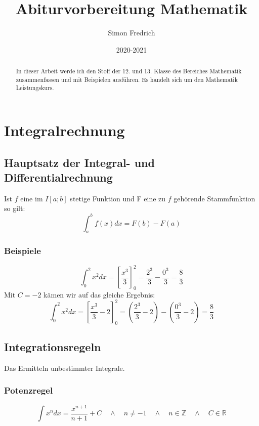 \documentclass[12pt, a4paper]{report}
\title{Abiturvorbereitung Mathematik}
\author{Simon Fredrich}
\date{2020-2021}
\begin{document}
\begin{titlepage}
\maketitle
\end{titlepage}

\begin{abstract}
In dieser Arbeit werde ich den Stoff der 12. und 13. Klasse des Bereiches Mathematik zusammenfassen und mit Beispielen ausführen. Es handelt sich um den Mathematik Leistungskurs.
\end{abstract}

\chapter{Integralrechnung}

\section{Hauptsatz der Integral- und Differentialrechnung}
Ist $f$ eine im $I[a;b]$ stetige Funktion und F eine zu $f$ gehörende Stammfunktion so gilt:\\
\begin{equation}
\int_{a}^{b} f(x) dx = F(b)-F(a)
\end{equation}

\subsection{Beispiele}

\begin{equation}
\int_{0}^{2} x^2 dx = \left[\frac{x^3}{3}\right]_0^2=\frac{2^3}{3}-\frac{0^3}{3}=\frac{8}{3}
\end{equation}
Mit $C=-2$ kämen wir auf das gleiche Ergebnis:
\begin{equation}
\int_{0}^{2} x^2 dx = \left[\frac{x^3}{3}-2\right]_0^2=\left(\frac{2^3}{3}-2\right)-\left(\frac{0^3}{3}-2\right)=\frac{8}{3}
\end{equation}

\section{Integrationsregeln}
Das Ermitteln unbestimmter Integrale.
\subsection{Potenzregel}
\begin{equation}
\int x^n dx = \frac{x^{n+1}}{n+1}+C\quad \land \quad n\neq-1\quad \land \quad n\in \mathbb{Z}\quad \land \quad  C\in \mathbb{R}
\end{equation}
\end{document}

